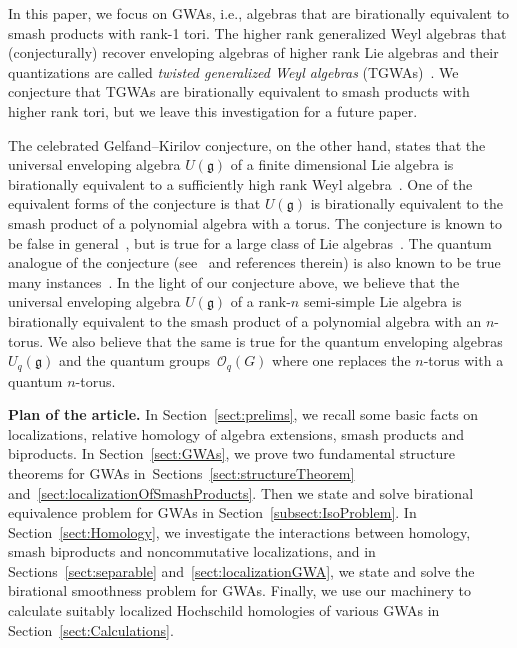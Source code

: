 \documentclass[10pt,a4paper]{amsart}
\newcommand{\G}[1]{\mathfrak{#1}}
\newcommand{\C}[1]{\mathcal{#1}}
\numberwithin{equation}{section}
\begin{document}
In this paper, we focus on GWAs, i.e., algebras that are birationally equivalent to smash products
with rank-1 tori. The higher rank generalized Weyl algebras that (conjecturally) recover enveloping
algebras of higher rank Lie algebras and their quantizations are called \emph{twisted generalized
 Weyl algebras} (TGWAs)~\cite{Hartwig:LocallyFiniteSimpleWeights,
 Hartwig:TGWAs, MPT03,MazorchukTurowska:TGWAs}. We conjecture that TGWAs are birationally equivalent to smash products with
higher rank tori, but we leave this investigation for a future paper.

The celebrated Gelfand--Kirilov conjecture, on the other hand, states that the universal enveloping
algebra $U(\G{g})$ of a finite dimensional Lie algebra is birationally equivalent to a sufficiently
high rank Weyl algebra~\cite{GelfandKirilov:Conjecture}. One of the equivalent forms of the
conjecture is that $U(\G{g})$ is birationally equivalent to the smash product of a polynomial
algebra with a torus. The conjecture is known to be false in general~\cite{AOV:CounterExamplesToGK,
 CKPR11}, but is true for a large class of Lie algebras~\cite{GelfandKirilov:Conjecture,
 Joseph:GKConjecture, Hai:GKConjecture}. The quantum analogue of the conjecture
(see~\cite[pp.~19--21 and Section~II.10.4]{BrownGoodearl:QuantumGroups} and references therein) is also
known to be true many instances~\cite{AlevDumas:QuantumGK, FutornyHartwig:QuantumGK}. In the light
of our conjecture above, we believe that the universal enveloping algebra $U(\G{g})$ of a rank-$n$
semi-simple Lie algebra is birationally equivalent to the smash product of a polynomial algebra with
an $n$-torus. We also believe that the same is true for the quantum enveloping algebras
$U_q(\G{g})$ and the quantum groups~$\C{O}_q(G)$ where one replaces the $n$-torus with a quantum
$n$-torus.

{\bf Plan of the article.}
In Section~\ref{sect:prelims}, we recall some basic facts on localizations, relative homology
of algebra extensions, smash products and biproducts. In Section~\ref{sect:GWAs}, we prove
two fundamental structure theorems for GWAs in~Sections~\ref{sect:structureTheorem}
and~\ref{sect:localizationOfSmashProducts}. Then we state and solve birational equivalence
problem for GWAs in Section~\ref{subsect:IsoProblem}. In Section~\ref{sect:Homology}, we
investigate the interactions between homology, smash biproducts and noncommutative
localizations, and in Sections~\ref{sect:separable} and~\ref{sect:localizationGWA}, we state
and solve the birational smoothness problem for GWAs. Finally, we use our machinery to
calculate suitably localized Hochschild homologies of various GWAs in
Section~\ref{sect:Calculations}.
\end{document}
